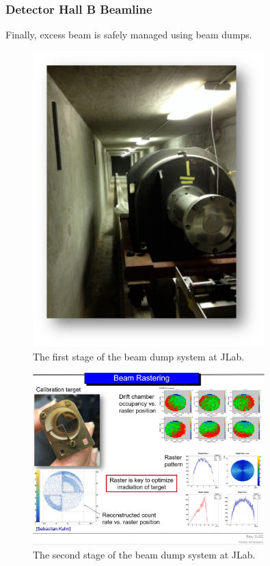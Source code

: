 \subsubsection{Detector Hall B Beamline}
    
Finally, excess beam is safely managed using beam dumps. 

\begin{figure}[ht]
    \centering
    \includegraphics[width=0.8\textwidth]{Chapters/Ch2-Experiment/accel_and_beamline/pics/hallB/beamdump1.png}
    \caption{The first stage of the beam dump system at JLab.}
    \label{fig:beam_dump1}
\end{figure}


\begin{figure}[ht]
    \centering
    \includegraphics[width=0.8\textwidth]{Chapters/Ch2-Experiment/accel_and_beamline/pics/hallB/beam_rastering.png}
    \caption{The second stage of the beam dump system at JLab.}
    \label{fig:rastering}
\end{figure}



